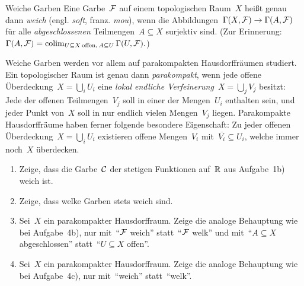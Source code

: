\documentclass{uebblatt}
\begin{document}
\begin{aufgabe}{Weiche Garben}
Eine Garbe~$\mathcal{F}$ auf einem topologischen Raum~$X$ heißt genau dann \emph{weich}
(engl. \emph{soft}, franz. \emph{mou}), wenn die Abbildungen~$\Gamma(X,\mathcal{F}) \to
\Gamma(A,\mathcal{F})$ für alle \emph{abgeschlossenen} Teilmengen~$A \subseteq X$
surjektiv sind. (Zur Erinnerung:~$\Gamma(A,\mathcal{F}) = \operatorname{colim}\limits_{{U \subseteq
X\,\text{offen},\,A \subseteq U}} \Gamma(U,\mathcal{F}).$)

Weiche Garben werden vor allem auf parakompakten Hausdorffräumen studiert. Ein
topologischer Raum ist genau dann \emph{parakompakt}, wenn jede offene
Überdeckung~$X = \bigcup_i U_i$ eine \emph{lokal endliche Verfeinerung}~$X =
\bigcup_j V_j$ besitzt: Jede der offenen Teilmengen~$V_j$ soll in einer der
Mengen~$U_i$ enthalten sein, und jeder Punkt von~$X$ soll in nur endlich
vielen Mengen~$V_j$ liegen. Parakompakte Hausdorffräume haben ferner folgende
besondere Eigenschaft: Zu jeder offenen Überdeckung~$X = \bigcup_i U_i$
existieren offene Mengen~$V_i$ mit~$\overline{V_i} \subseteq U_i$, welche immer
noch~$X$ überdecken.

\begin{enumerate}
\item Zeige, dass die Garbe~$\mathcal{C}$ der stetigen Funktionen auf~$\mathbb{R}$ aus
Aufgabe~1b) weich ist.
\item Zeige, dass welke Garben stets weich sind.
\item Sei~$X$ ein parakompakter Hausdorffraum. Zeige die analoge Behauptung wie
bei Aufgabe~4b), nur mit~"`$\mathcal{F}$ weich"' statt~"`$\mathcal{F}$ welk"' und mit~"`$A
\subseteq X$ abgeschlossen"' statt~"`$U \subseteq X$ offen"'.
\item Sei~$X$ ein parakompakter Hausdorffraum. Zeige die analoge Behauptung wie
bei Aufgabe~4c), nur mit~"`weich"' statt~"`welk"'.
\end{enumerate}
\end{aufgabe}
\end{document}
